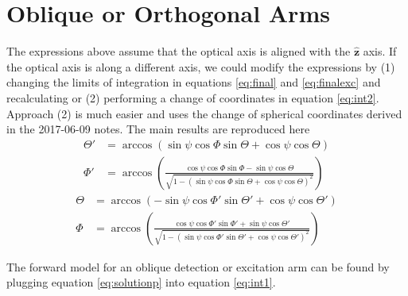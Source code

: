 \documentclass[11pt]{article}
\providecommand{\mh}[1]{\mathbf{\hat{#1}}}
\begin{document}
\section{Oblique or Orthogonal Arms}
The expressions above assume that the optical axis is aligned with the $\mh{z}$
axis. If the optical axis is along a different axis, we could modify the
expressions by (1) changing the limits of integration in equations
\ref{eq:final} and \ref{eq:finalexc} and recalculating or (2) performing a
change of coordinates in equation \ref{eq:int2}. Approach (2) is much easier and
uses the change of spherical coordinates derived in the 2017-06-09 notes. The
main results are reproduced here
\begin{subequations}
\begin{align}
  \Theta' &= \arccos\left(\sin\psi\cos\Phi\sin\Theta + \cos\psi\cos\Theta\right)\label{eq:thetap}\\
  \Phi' &= \arccos\left(\frac{\cos\psi\cos\Phi\sin\Phi - \sin\psi\cos\Theta}{\sqrt{1 - (\sin\psi\cos\Phi\sin\Theta + \cos\psi\cos\Theta)^2}}\right)\label{eq:phip}
\end{align}\label{eq:solution}%
\end{subequations}
\begin{subequations}
\begin{align}
  \Theta &= \arccos\left(-\sin\psi\cos\Phi'\sin\Theta' + \cos\psi\cos\Theta'\right)\\
  \Phi &= \arccos\left(\frac{\cos\psi\cos\Phi'\sin\Phi' + \sin\psi\cos\Theta'}{\sqrt{1 - (\sin\psi\cos\Phi'\sin\Theta' + \cos\psi\cos\Theta')^2}}\right)
\end{align}\label{eq:solutionp}%
\end{subequations}

The forward model for an oblique detection or excitation arm can be found by plugging
equation \ref{eq:solutionp} into equation \ref{eq:int1}.
\end{document}
